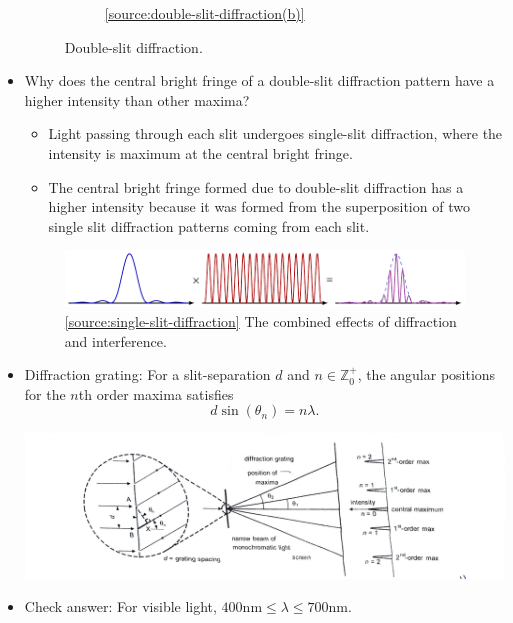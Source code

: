 \documentclass[oneside]{book}
\begin{document}
\begin{itemize}
\begin{figure}[H]
\begin{subfigure}[c]{0.5\textwidth}
            \caption{\ref{source:double-slit-diffraction(b)}}
            \label{fig:double-slit-diffraction(b)}
        \end{subfigure}
        \caption{Double-slit diffraction.}
        \label{fig:double-slit}
    \end{figure}
    \item Why does the central bright fringe of a double-slit diffraction pattern have a higher intensity than other maxima?
    \begin{itemize}
        \item Light passing through each slit undergoes single-slit diffraction, where the intensity is maximum at the central bright fringe.
        \item The central bright fringe formed due to double-slit diffraction has a higher intensity because it was formed from the superposition of two single slit diffraction patterns coming from each slit.
    \end{itemize}
    \begin{figure}[H]
        \centering
        \includegraphics[page=1]{../images/single-slit-diffraction/single-slit-diffraction.pdf}
        \caption{\ref{source:single-slit-diffraction} The combined effects of diffraction and interference.}
        \label{fig:combined-single-double-diffraction}
    \end{figure}
    \item Diffraction grating: For a slit-separation \(d\) and \(n \in \mathbb{Z}^{+}_{0}\), the angular positions for the \(n\)th order maxima satisfies
    \[d \sin(\theta_n)=n\lambda.\]
    \begin{center}
        \includegraphics[scale=0.1]{../images/Diffraction Grating.jpg}
        \captionsetup{type=figure}
    \end{center}
    \item Check answer: For visible light, \(400\text{nm} \leq \lambda \leq 700\text{nm}\).

\end{itemize}
\end{document}
